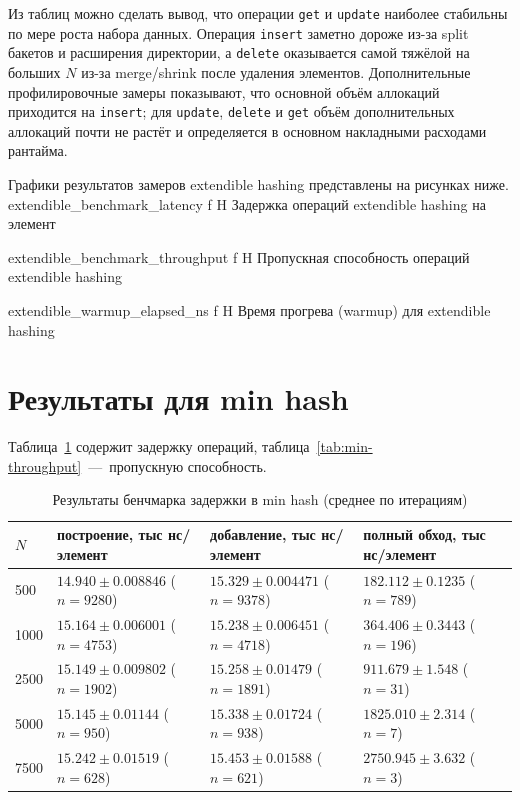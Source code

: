 \documentclass{itmo}
\begin{document}
Из таблиц можно сделать вывод, что операции \texttt{get} и \texttt{update} наиболее стабильны по мере роста набора данных.
Операция \texttt{insert} заметно дороже из-за split бакетов и расширения директории, а \texttt{delete} оказывается самой тяжёлой на больших $N$ из-за merge/shrink после удаления элементов.
Дополнительные профилировочные замеры показывают, что основной объём аллокаций приходится на \texttt{insert}; для \texttt{update}, \texttt{delete} и \texttt{get} объём дополнительных аллокаций почти не растёт и определяется в основном накладными расходами рантайма.

Графики результатов замеров extendible hashing представлены на рисунках ниже.
	{extendible_benchmark_latency}
	{f}
	{H}
	{\textwidth}
	{Задержка операций extendible hashing на элемент}

	{extendible_benchmark_throughput}
	{f}
	{H}
	{\textwidth}
	{Пропускная способность операций extendible hashing}

	{extendible_warmup_elapsed_ns}
	{f}
	{H}
	{\textwidth}
	{Время прогрева (warmup) для extendible hashing}

\section{Результаты для min hash}

Таблица~\ref{tab:min-latency} содержит задержку операций, таблица~\ref{tab:min-throughput}~---~пропускную способность.
\begin{table}[H]
	\centering
	\caption{Результаты бенчмарка задержки в min hash (среднее по итерациям)}
	\label{tab:min-latency}
	\begin{tabularx}{\textwidth}{|l|X|X|X|}
		\toprule
		$N$ & построение, тыс нс/элемент & добавление, тыс нс/элемент & полный обход, тыс нс/элемент \\
		\midrule
		500 & $14.940 \pm 0.008846$ ($n=9280$) & $15.329 \pm 0.004471$ ($n=9378$) & $182.112 \pm 0.1235$ ($n=789$) \\
		1000 & $15.164 \pm 0.006001$ ($n=4753$) & $15.238 \pm 0.006451$ ($n=4718$) & $364.406 \pm 0.3443$ ($n=196$) \\
		2500 & $15.149 \pm 0.009802$ ($n=1902$) & $15.258 \pm 0.01479$ ($n=1891$) & $911.679 \pm 1.548$ ($n=31$) \\
		5000 & $15.145 \pm 0.01144$ ($n=950$) & $15.338 \pm 0.01724$ ($n=938$) & $1825.010 \pm 2.314$ ($n=7$) \\
		7500 & $15.242 \pm 0.01519$ ($n=628$) & $15.453 \pm 0.01588$ ($n=621$) & $2750.945 \pm 3.632$ ($n=3$) \\
		\bottomrule
	\end{tabularx}
\end{table}
\end{document}

